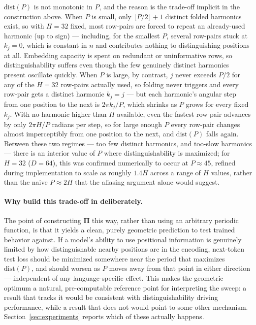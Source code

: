\documentclass[11pt]{article}
\begin{document}
$\mathrm{dist}(P)$ is not monotonic in $P$, and the reason is the trade-off implicit in the construction above. When $P$ is small, only $\lfloor P/2 \rfloor + 1$ distinct folded harmonics exist, so with $H = 32$ fixed, most row-pairs are forced to repeat an already-used harmonic (up to sign) --- including, for the smallest $P$, several row-pairs stuck at $k_j = 0$, which is constant in $n$ and contributes nothing to distinguishing positions at all. Embedding capacity is spent on redundant or uninformative rows, so distinguishability suffers even though the few genuinely distinct harmonics present oscillate quickly. When $P$ is large, by contrast, $j$ never exceeds $P/2$ for any of the $H = 32$ row-pairs actually used, so folding never triggers and every row-pair gets a distinct harmonic $k_j = j$ --- but each harmonic's angular step from one position to the next is $2\pi k_j / P$, which shrinks as $P$ grows for every fixed $k_j$. With no harmonic higher than $H$ available, even the fastest row-pair advances by only $2\pi H / P$ radians per step, so for large enough $P$ every row-pair changes almost imperceptibly from one position to the next, and $\mathrm{dist}(P)$ falls again. Between these two regimes --- too few distinct harmonics, and too-slow harmonics --- there is an interior value of $P$ where distinguishability is maximized; for $H = 32$ ($D = 64$), this was confirmed numerically to occur at $P \approx 45$, refined during implementation to scale as roughly $1.4H$ across a range of $H$ values, rather than the naive $P \approx 2H$ that the aliasing argument alone would suggest.

\paragraph{Why build this trade-off in deliberately.} The point of constructing $\mathbf{\Pi}$ this way, rather than using an arbitrary periodic function, is that it yields a clean, purely geometric prediction to test trained behavior against. If a model's ability to use positional information is genuinely limited by how distinguishable nearby positions are in the encoding, next-token test loss should be minimized somewhere near the period that maximizes $\mathrm{dist}(P)$, and should worsen as $P$ moves away from that point in either direction --- independent of any language-specific effect. This makes the geometric optimum a natural, pre-computable reference point for interpreting the sweep: a result that tracks it would be consistent with distinguishability driving performance, while a result that does not would point to some other mechanism. Section~\ref{sec:experiments} reports which of these actually happens.
\end{document}

